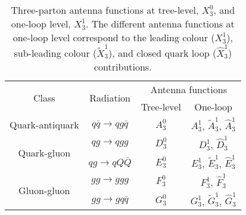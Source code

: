 \documentclass[main.tex]{subfiles}
\begin{document}
    \begin{table}[ht]
        \begin{tabular}{ cccc } 
            \toprule
            \multirow{2}[3]{*}{Class} & \multirow{2}[3]{*}{Radiation} & \multicolumn{2}{c}{Antenna functions} \\
            \cmidrule(lr){3-4}
             & & Tree-level & One-loop \\
            \midrule
            Quark-antiquark & $q \bar{q} \rightarrow q g \bar{q}$& $A_{3}^{0}$ & $A_{3}^{1}$, $\tilde{A}_{3}^{1}$, $\hat{A}_{3}^{1}$ \\
            \midrule
            \multirow{2}{*}{Quark-gluon} & $q g \rightarrow q g g$ & $D_{3}^{0}$ & $D_{3}^{1}$, $\hat{D}_{3}^{1}$ \\
            \cmidrule(lr){2-4}
             & $qg \rightarrow q Q \bar{Q}$ & $E_{3}^{0}$ & $E_{3}^{1}$, $\tilde{E}_{3}^{1}$, $\hat{E}_{3}^{1}$ \\
            \midrule
            \multirow{2}{*}{Gluon-gluon} & $g g \rightarrow g g g$ & $F_{3}^{0}$ & $F_{3}^{1}$, $\hat{F}_{3}^{1}$ \\
            \cmidrule(lr){2-4}
            & $g g \rightarrow g q \bar{q}$ & $G_{3}^{0}$ & $G_{3}^{1}$, $\tilde{G}_{3}^{1}$, $\hat{G}_{3}^{1}$ \\
            \bottomrule
        \end{tabular}
        \caption{Three-parton antenna functions at tree-level, $X_{3}^{0}$,
        and one-loop level, $X_{3}^{1}$. The different antenna functions at
        one-loop level correspond to the leading colour ($X_{3}^{1}$),
        sub-leading colour ($\tilde{X}_{3}^{1}$), and closed quark loop
        ($\hat{X}_{3}^{1}$) contributions.}
        \label{table:antenna_functions}
    \end{table}
\end{document}
